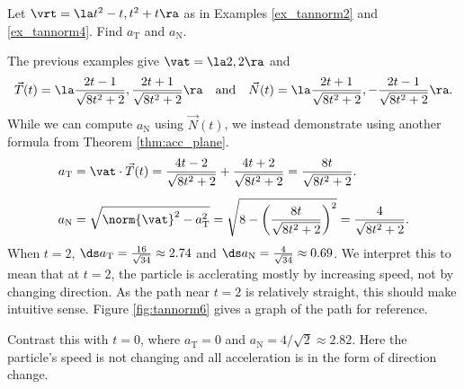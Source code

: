{Let $\vrt=\la t^2-t,t^2+t\ra$ as in Examples \ref{ex_tannorm2} and \ref{ex_tannorm4}. Find $a_\text{T}$ and $a_\text{N}$.}
{The previous examples give $\vat = \la 2,2\ra$ and
$$\vec T(t) = \la \frac{2t-1}{\sqrt{8t^2+2}},\frac{2t+1}{\sqrt{8t^2+2}}\ra \quad \text{and}\quad \vec N(t) = \la \frac{2t+1}{\sqrt{8t^2+2}},-\frac{2t-1}{\sqrt{8t^2+2}}\ra.$$
While we can compute $a_\text{N}$ using $\vec N(t)$, we instead demonstrate using another formula from Theorem \ref{thm:acc_plane}.
\begin{align*}
a_\text{T} &= \vat\cdot\vec T(t) = \frac{4t-2}{\sqrt{8t^2+2}}+\frac{4t+2}{\sqrt{8t^2+2}} = \frac{8t}{\sqrt{8t^2+2}}.\\
a_\text{N} &= \sqrt{\norm{\vat}^2-a_\text{T}^2} = \sqrt{8-\left(\frac{8t}{\sqrt{8t^2+2}}\right)^2}=\frac{4}{\sqrt{8t^2+2}}\rule{0pt}{25pt}.
\end{align*}
When $t=2$, $\ds a_\text{T} = \frac{16}{\sqrt{34}}\approx 2.74$ and $\ds a_\text{N} = \frac{4}{\sqrt{34}} \approx 0.69$. We interpret this to mean that at $t=2$, the particle is acclerating mostly by increasing speed, not by changing direction. As the path near $t=2$ is relatively straight, this should make intuitive sense. Figure \ref{fig:tannorm6} gives a graph of the path for reference.

Contrast this with $t=0$, where $a_\text{T} = 0$ and $a_\text{N} = 4/\sqrt{2}\approx 2.82$. Here the particle's speed is not changing and all acceleration is in the form of direction change.
}\\

